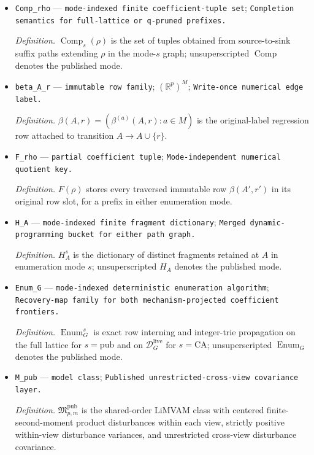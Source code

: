 \documentclass{article}
\begin{document}
\begin{itemize}
  \item \texttt{Comp\_\allowbreak{}rho} --- \texttt{mode-\allowbreak{}indexed finite coefficient-\allowbreak{}tuple set}; \texttt{Completion semantics for full-\allowbreak{}lattice or q-\allowbreak{}pruned prefixes.}
  \par\smallskip\noindent\emph{Definition.} \(\operatorname{Comp}_s(\rho)\) is the set of tuples obtained from source-to-sink suffix paths extending \(\rho\) in the mode-\(s\) graph; unsuperscripted \(\operatorname{Comp}\) denotes the published mode.
  \item \texttt{beta\_\allowbreak{}A\_\allowbreak{}r} --- \texttt{immutable row family}; \((\mathbb R^p)^M\); \texttt{Write-\allowbreak{}once numerical edge label.}
  \par\smallskip\noindent\emph{Definition.} \(\beta(A,r)=(\beta^{(a)}(A,r):a\in M)\) is the original-label regression row attached to transition \(A\to A\cup\{r\}\).
  \item \texttt{F\_\allowbreak{}rho} --- \texttt{partial coefficient tuple}; \texttt{Mode-\allowbreak{}independent numerical quotient key.}
  \par\smallskip\noindent\emph{Definition.} \(F(\rho)\) stores every traversed immutable row \(\beta(A',r')\) in its original row slot, for a prefix in either enumeration mode.
  \item \texttt{H\_\allowbreak{}A} --- \texttt{mode-\allowbreak{}indexed finite fragment dictionary}; \texttt{Merged dynamic-\allowbreak{}programming bucket for either path graph.}
  \par\smallskip\noindent\emph{Definition.} \(H_A^s\) is the dictionary of distinct fragments retained at \(A\) in enumeration mode \(s\); unsuperscripted \(H_A\) denotes the published mode.
  \item \texttt{Enum\_\allowbreak{}G} --- \texttt{mode-\allowbreak{}indexed deterministic enumeration algorithm}; \texttt{Recovery-\allowbreak{}map family for both mechanism-\allowbreak{}projected coefficient frontiers.}
  \par\smallskip\noindent\emph{Definition.} \(\operatorname{Enum}_G^s\) is exact row interning and integer-trie propagation on the full lattice for \(s=\mathrm{pub}\) and on \(\mathcal D_G^{\mathrm{live}}\) for \(s=\mathrm{CA}\); unsuperscripted \(\operatorname{Enum}_G\) denotes the published mode.
  \item \texttt{M\_\allowbreak{}pub} --- \texttt{model class}; \texttt{Published unrestricted-\allowbreak{}cross-\allowbreak{}view covariance layer.}
  \par\smallskip\noindent\emph{Definition.} \(\mathfrak M_{p,m}^{\mathrm{pub}}\) is the shared-order LiMVAM class with centered finite-second-moment product disturbances within each view, strictly positive within-view disturbance variances, and unrestricted cross-view disturbance covariance.

\end{itemize}
\end{document}
